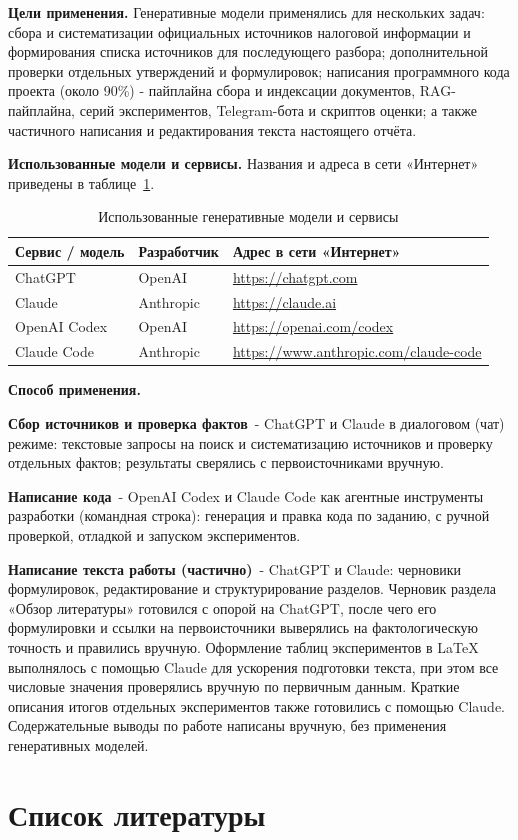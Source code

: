 \documentclass[a4paper,12pt]{article}
\begin{document}
\textbf{Цели применения.} Генеративные модели применялись для нескольких задач: сбора и систематизации официальных источников налоговой информации и формирования списка источников для последующего разбора; дополнительной проверки отдельных утверждений и формулировок; написания программного кода проекта (около 90\%) - пайплайна сбора и индексации документов, RAG-пайплайна, серий экспериментов, Telegram-бота и скриптов оценки; а также частичного написания и редактирования текста настоящего отчёта.

\textbf{Использованные модели и сервисы.} Названия и адреса в сети «Интернет» приведены в таблице~\ref{tab:genai}.

\begin{table}[H]
\centering
\small
\caption{Использованные генеративные модели и сервисы}
\label{tab:genai}
\renewcommand{\arraystretch}{1.1}
\begin{tabular}{|l|l|l|}
\hline\hline
\textbf{Сервис / модель} & \textbf{Разработчик} & \textbf{Адрес в сети «Интернет»} \\
\hline
ChatGPT & OpenAI & \url{https://chatgpt.com} \\
Claude & Anthropic & \url{https://claude.ai} \\
OpenAI Codex & OpenAI & \url{https://openai.com/codex} \\
Claude Code & Anthropic & \url{https://www.anthropic.com/claude-code} \\
\hline
\end{tabular}
\end{table}
\FloatBarrier

\textbf{Способ применения.}

\textbf{Сбор источников и проверка фактов}~- ChatGPT и Claude в диалоговом (чат) режиме: текстовые запросы на поиск и систематизацию источников и проверку отдельных фактов; результаты сверялись с первоисточниками вручную.

\textbf{Написание кода}~- OpenAI Codex и Claude Code как агентные инструменты разработки (командная строка): генерация и правка кода по заданию, с ручной проверкой, отладкой и запуском экспериментов.

\textbf{Написание текста работы (частично)}~- ChatGPT и Claude: черновики формулировок, редактирование и структурирование разделов. Черновик раздела «Обзор литературы» готовился с опорой на ChatGPT, после чего его формулировки и ссылки на первоисточники выверялись на фактологическую точность и правились вручную. Оформление таблиц экспериментов в LaTeX выполнялось с помощью Claude для ускорения подготовки текста, при этом все числовые значения проверялись вручную по первичным данным. Краткие описания итогов отдельных экспериментов также готовились с помощью Claude. Содержательные выводы по работе написаны вручную, без применения генеративных моделей.


\newpage
\section{Список литературы}
\printbibliography[heading=none]
\end{document}
